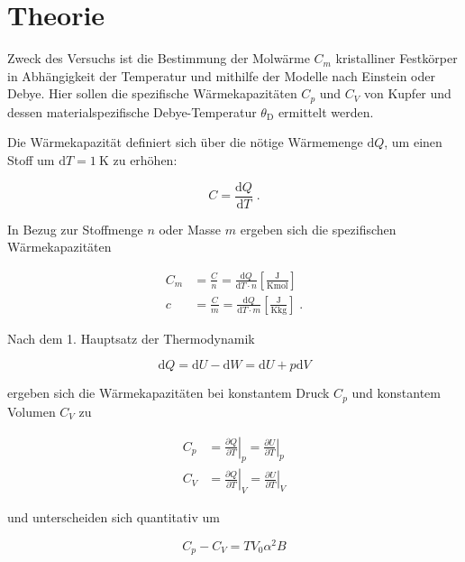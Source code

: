 \section{Theorie}
\label{sec:Theorie}

Zweck des Versuchs ist die Bestimmung der Molwärme $C_m$ kristalliner Festkörper in Abhängigkeit der Temperatur
und mithilfe der Modelle nach Einstein oder Debye. Hier sollen die spezifische Wärmekapazitäten $C_p$ und $C_V$ von Kupfer
und dessen materialspezifische Debye-Temperatur $\theta_\text{D}$ ermittelt werden.

Die Wärmekapazität definiert sich über die nötige Wärmemenge $\text{d}Q$, um einen Stoff um $\text{d}T = \SI{1}{\kelvin}$
zu erhöhen:

\begin{equation}
    C = \frac{\text{d}Q}{\text{d}T} \; .
\end{equation}

In Bezug zur Stoffmenge $n$ oder Masse $m$ ergeben sich die spezifischen Wärmekapazitäten

\begin{align}
    C_m &= \frac{C}{n} = \frac{\text{d}Q}{\text{d}T \cdot n} \left[\frac{\si{\joule}}{\si{\kelvin\mol}}\right] \\
    c &= \frac{C}{m} = \frac{\text{d}Q}{\text{d}T \cdot m} \left[\frac{\si{\joule}}{\si{\kelvin\kilo\gram}}\right] \; .
\end{align}

Nach dem 1. Hauptsatz der Thermodynamik 

\begin{equation}
 \text{d}Q = \text{d}U - \text{d}W = \text{d}U + p\text{d}V
\end{equation}

ergeben sich die Wärmekapazitäten bei konstantem Druck $C_p$ und konstantem Volumen $C_V$ zu 

\begin{align}
    C_p &= \left. \frac{\partial Q}{\partial T}\right|_p = \left. \frac{\partial U}{\partial T}\right|_p \\
    C_V &= \left. \frac{\partial Q}{\partial T}\right|_V = \left. \frac{\partial U}{\partial T}\right|_V
\end{align}

und unterscheiden sich quantitativ um

\begin{equation}
    C_p - C_V = T V_0 \alpha^2 B
    \label{eqn:Umrechnung}
\end{equation}

